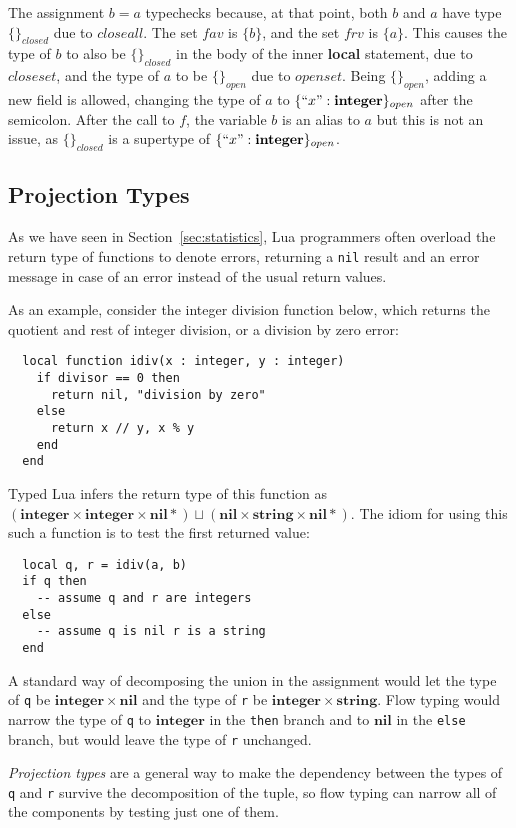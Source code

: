 \documentclass{sigplanconf}
\newcommand{\Nil}{\mathbf{nil}}
\newcommand{\Integer}{\mathbf{integer}}
\newcommand{\String}{\mathbf{string}}
\begin{document}
The assignment $b=a$ typechecks because, at that point, 
both $b$ and $a$ have type $\{\}_{closed}$ due to $closeall$.
The set $fav$ is $\{b\}$, and the set $frv$ is $\{a\}$.
This causes the type of $b$ to also be $\{\}_{closed}$
in the body of the inner {\bf local} statement, due to $closeset$, and the type of $a$ to be $\{\}_{open}$ due
to $openset$. Being $\{\}_{open}$, adding a new field
is allowed, changing the type of $a$ to $\{``x": \Integer\}_{open}$ after the semicolon. After the call to
$f$, the variable $b$ is an alias to $a$ but this is not
an issue, as $\{\}_{closed}$ is a supertype of $\{``x": \Integer\}_{open}$.

\subsection{Projection Types}
\label{sec:projections}

As we have seen in Section~\ref{sec:statistics}, Lua
programmers often overload the return type of functions
to denote errors, returning a {\tt nil} result and
an error message in case of an error instead of the
usual return values.

As an example, consider the integer division function
below, which returns the quotient and rest of integer
division, or a division by zero error:
\begin{verbatim}
  local function idiv(x : integer, y : integer)
    if divisor == 0 then
      return nil, "division by zero"
    else
      return x // y, x % y
    end 
  end
\end{verbatim}

Typed Lua infers the return type of this function as
$(\Integer \times \Integer \times \Nil*) \sqcup (\Nil \times \String \times \Nil{*})$. The idiom for using this such
a function is to test the first returned value:
\begin{verbatim}
  local q, r = idiv(a, b)
  if q then
    -- assume q and r are integers
  else 
    -- assume q is nil r is a string
  end
\end{verbatim}

A standard way of decomposing the union in the assignment
would let the type of {\tt q} be $\Integer \times \Nil$ and
the type of {\tt r} be $\Integer \times \String$. Flow typing
would narrow the type of {\tt q} to $\Integer$ in the {\tt then}
branch and to $\Nil$ in the {\tt else} branch, but would
leave the type of {\tt r} unchanged.

{\em Projection types}
are a general way to make the dependency between the types
of {\tt q} and {\tt r} survive the decomposition of the tuple,
so flow typing can narrow all of the components by testing
just one of them.
\end{document}
